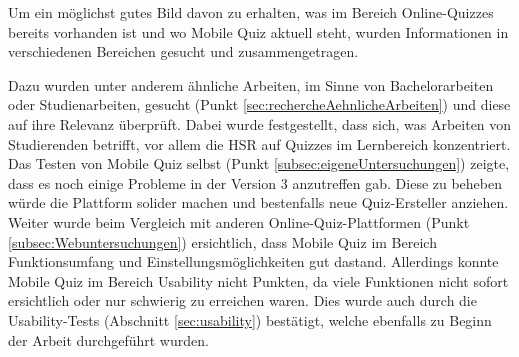 







Um ein möglichst gutes Bild davon zu erhalten, was im Bereich Online-Quizzes bereits vorhanden ist und wo Mobile Quiz aktuell steht, wurden Informationen in verschiedenen Bereichen gesucht und zusammengetragen.

Dazu wurden unter anderem ähnliche Arbeiten, im Sinne von Bachelorarbeiten oder Studienarbeiten, gesucht (Punkt \ref{sec:rechercheAehnlicheArbeiten}) und diese auf ihre Relevanz überprüft. Dabei wurde festgestellt, dass sich, was Arbeiten von Studierenden betrifft, vor allem die HSR auf Quizzes im Lernbereich konzentriert. 
Das Testen von Mobile Quiz selbst (Punkt \ref{subsec:eigeneUntersuchungen}) zeigte, dass es noch einige Probleme in der Version 3 anzutreffen gab. Diese zu beheben würde die Plattform solider machen und bestenfalls neue Quiz-Ersteller anziehen.
Weiter wurde beim Vergleich mit anderen Online-Quiz-Plattformen (Punkt \ref{subsec:Webuntersuchungen}) ersichtlich, dass Mobile Quiz im Bereich Funktionsumfang und Einstellungsmöglichkeiten gut dastand. Allerdings konnte Mobile Quiz im Bereich Usability nicht Punkten, da viele Funktionen nicht sofort ersichtlich oder nur schwierig zu erreichen waren. Dies wurde auch durch die Usability-Tests (Abschnitt \ref{sec:usability}) bestätigt, welche ebenfalls zu Beginn der Arbeit durchgeführt wurden.

